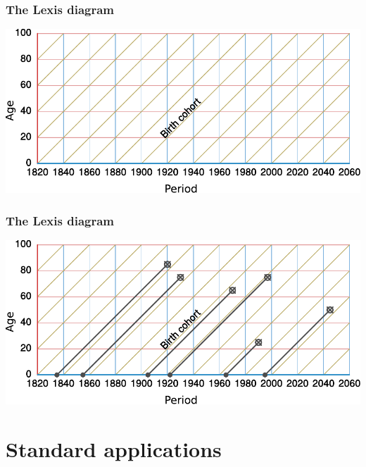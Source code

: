 \documentclass[20pt]{beamer}
\begin{document}
\begin{frame}
\frametitle{The Lexis diagram}
\includegraphics[scale=1.5]{Figures/APCrt2.pdf}\\
\end{frame}

\begin{frame}
\frametitle{The Lexis diagram}
\includegraphics[scale=1.5]{Figures/APCrt3.pdf}\\
\end{frame}

\section{Standard applications}
\end{document}
